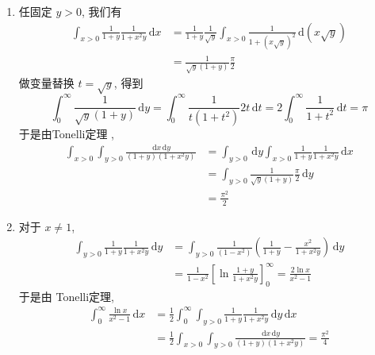 \documentclass[../main.tex]{subfiles}
\begin{document}
\begin{solution}
    \begin{enumerate}
        \item  任固定 \(  y> 0  \), 我们有 \[
      \begin{aligned}
        \int_{x> 0} \frac{1 }{1+ y }\frac{1 }{1+ x^{2}y }\,\mathrm{d} x&= \frac{1 }{1+ y }\frac{1 }{\sqrt{y} } \int_{x> 0}\frac{1 }{1+ \left( x\sqrt{y} \right)^{2}  }\,\mathrm{d} \left( x\sqrt{y} \right)      \\ 
         &= \frac{1 }{\sqrt{y}\left( 1+ y \right)  } \frac{ \pi  }{2 } 
      \end{aligned}
        \] 做变量替换 \(  t= \sqrt{y}  \), 得到 \[
        \int_{0}^{\infty}\frac{1 }{\sqrt{y}\left( 1+ y \right)  }\,\mathrm{d} y=  \int_{0}^{\infty}\frac{1 }{t\left( 1+ t^{2} \right)  }2t\,\mathrm{d} t = 2\int_{0}^{\infty}\frac{1 }{1+ t^{2} }\,\mathrm{d} t=  \pi  
        \]于是由Tonelli定理 , \[
      \begin{aligned}
        \int_{x> 0}\int_{y> 0}\frac{\,\mathrm{d} x\,\mathrm{d} y }{\left( 1+ y \right)\left( 1+ x^{2}y \right)   }&=   \int_{y> 0}\,\mathrm{d} y\int_{x> 0}\frac{1 }{1+ y }\frac{1 }{1+ x^{2}y }\,\mathrm{d} x\\ 
         &=  \int_{y> 0}\frac{1 }{\sqrt{y}\left( 1+ y \right)  }\frac{ \pi  }{2 }\,\mathrm{d} y\\ 
          &= \frac{ \pi ^{2} }{2 }   
      \end{aligned}   
        \]

        \item 对于 \(  x\neq 1  \),   \[
      \begin{aligned}
        \int_{y> 0}\frac{1 }{1+ y }\frac{1 }{1+ x^{2}y }\,\mathrm{d} y &= \int_{y> 0}\frac{1 }{\left(1-x^{2} \right)  } \left( \frac{1 }{1+ y }-\frac{x^{2} }{1+ x^{2}y }   \right)\,\mathrm{d} y \\ 
         &= \frac{1 }{1-x^{2} }\left[ \ln  \frac{1+ y }{1+ x^{2}y }  \right]_{0}^{\infty}  = \frac{2\ln x}{x^{2}-1 } 
      \end{aligned} 
        \]于是由 Tonelli定理,  \[
       \begin{aligned}
        \int_{0}^{\infty}\frac{\ln x }{x^{2}-1 }\,\mathrm{d} x&= \frac{1 }{2 } \int_{0}^{\infty}\int_{y> 0}\frac{1 }{1+ y }\frac{1 }{1+ x^{2}y }\,\mathrm{d} y\,\mathrm{d} x     \\ 
         &= \frac{1}{2}\int_{x> 0}\int_{y> 0}\frac{\,\mathrm{d} x\,\mathrm{d} y }{\left( 1+ y \right)\left( 1+ x^{2}y \right)   }= \frac{ \pi ^{2} }{4 }  
       \end{aligned}
        \]
    \end{enumerate}
    
\end{solution}
\end{document}

